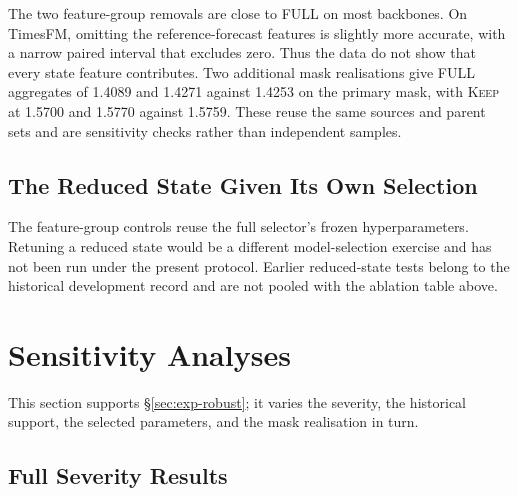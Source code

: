 \documentclass{article}
\begin{document}
The two feature-group removals are close to FULL on most backbones. On TimesFM, omitting the
reference-forecast features is slightly more accurate, with a narrow paired interval that
excludes zero. Thus the data do not show that every state feature contributes. Two additional
mask realisations give FULL aggregates of 1.4089 and 1.4271 against 1.4253 on the primary
mask, with \textsc{Keep} at 1.5700 and 1.5770 against 1.5759. These reuse the same sources
and parent sets and are sensitivity checks rather than independent samples.

\subsection{The Reduced State Given Its Own Selection}
\label{app:compact-selection}
The feature-group controls reuse the full selector's frozen hyperparameters. Retuning a
reduced state would be a different model-selection exercise and has not been run under the
present protocol. Earlier reduced-state tests belong to the historical development record
and are not pooled with the ablation table above.

\section{Sensitivity Analyses}

This section supports \S\ref{sec:exp-robust}; it varies the severity, the historical
support, the selected parameters, and the mask realisation in turn.

\subsection{Full Severity Results}
\label{app:severity-full}
\end{document}
